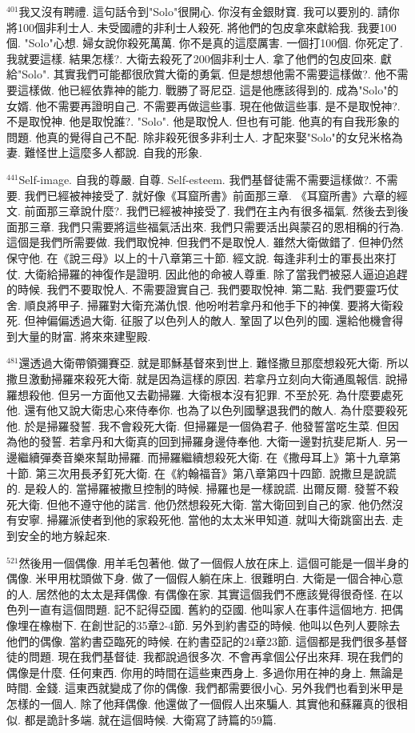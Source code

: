 \documentclass{book}
\begin{document}
$^{401}$我又沒有聘禮.
這句話令到"Solo"很開心.
你沒有金銀財寶.
我可以要別的.
請你將100個非利士人.
未受國禮的非利士人殺死.
將他們的包皮拿來獻給我.
我要100個.
"Solo"心想.
婦女說你殺死萬萬.
你不是真的這麼厲害.
一個打100個.
你死定了.
我就要這樣.
結果怎樣?.
大衛去殺死了200個非利士人.
拿了他們的包皮回來.
獻給"Solo".
其實我們可能都很欣賞大衛的勇氣.
但是想想他需不需要這樣做?.
他不需要這樣做.
他已經依靠神的能力.
戰勝了哥尼亞.
這是他應該得到的.
成為"Solo"的女婿.
他不需要再證明自己.
不需要再做這些事.
現在他做這些事.
是不是取悅神?.
不是取悅神.
他是取悅誰?.
"Solo".
他是取悅人.
但也有可能.
他真的有自我形象的問題.
他真的覺得自己不配.
除非殺死很多非利士人.
才配來娶"Solo"的女兒米格為妻.
難怪世上這麼多人都說.
自我的形象.

$^{441}$Self-image.
自我的尊嚴.
自尊.
Self-esteem.
我們基督徒需不需要這樣做?.
不需要.
我們已經被神接受了.
就好像《耳窟所書》前面那三章.
《耳窟所書》六章的經文.
前面那三章說什麼?.
我們已經被神接受了.
我們在主內有很多福氣.
然後去到後面那三章.
我們只需要將這些福氣活出來.
我們只需要活出與蒙召的恩相稱的行為.
這個是我們所需要做.
我們取悅神.
但我們不是取悅人.
雖然大衛做錯了.
但神仍然保守他.
在《說三母》以上的十八章第三十節.
經文說.
每逢非利士的軍長出來打仗.
大衛給掃羅的神復作是證明.
因此他的命被人尊重.
除了當我們被惡人逼迫追趕的時候.
我們不要取悅人.
不需要證實自己.
我們要取悅神.
第二點.
我們要靈巧仗舍.
順良將甲子.
掃羅對大衛充滿仇恨.
他吩咐若拿丹和他手下的神僕.
要將大衛殺死.
但神偏偏透過大衛.
征服了以色列人的敵人.
鞏固了以色列的國.
還給他機會得到大量的財富.
將來來建聖殿.

$^{481}$還透過大衛帶領彌賽亞.
就是耶穌基督來到世上.
難怪撒旦那麼想殺死大衛.
所以撒旦激動掃羅來殺死大衛.
就是因為這樣的原因.
若拿丹立刻向大衛通風報信.
說掃羅想殺他.
但另一方面他又去勸掃羅.
大衛根本沒有犯罪.
不至於死.
為什麼要處死他.
還有他又說大衛忠心來侍奉你.
也為了以色列國擊退我們的敵人.
為什麼要殺死他.
於是掃羅發誓.
我不會殺死大衛.
但掃羅是一個偽君子.
他發誓當吃生菜.
但因為他的發誓.
若拿丹和大衛真的回到掃羅身邊侍奉他.
大衛一邊對抗斐尼斯人.
另一邊繼續彈奏音樂來幫助掃羅.
而掃羅繼續想殺死大衛.
在《撒母耳上》第十九章第十節.
第三次用長矛釘死大衛.
在《約翰福音》第八章第四十四節.
說撒旦是說謊的.
是殺人的.
當掃羅被撒旦控制的時候.
掃羅也是一樣說謊.
出爾反爾.
發誓不殺死大衛.
但他不遵守他的諾言.
他仍然想殺死大衛.
當大衛回到自己的家.
他仍然沒有安寧.
掃羅派使者到他的家殺死他.
當他的太太米甲知道.
就叫大衛跳窗出去.
走到安全的地方躲起來.

$^{521}$然後用一個偶像.
用羊毛包著他.
做了一個假人放在床上.
這個可能是一個半身的偶像.
米甲用枕頭做下身.
做了一個假人躺在床上.
很難明白.
大衛是一個合神心意的人.
居然他的太太是拜偶像.
有偶像在家.
其實這個我們不應該覺得很奇怪.
在以色列一直有這個問題.
記不記得亞國.
舊約的亞國.
他叫家人在事件這個地方.
把偶像埋在橡樹下.
在創世記的35章2-4節.
另外到約書亞的時候.
他叫以色列人要除去他們的偶像.
當約書亞臨死的時候.
在約書亞記的24章23節.
這個都是我們很多基督徒的問題.
現在我們基督徒.
我都說過很多次.
不會再拿個公仔出來拜.
現在我們的偶像是什麼.
任何東西.
你用的時間在這些東西身上.
多過你用在神的身上.
無論是時間.
金錢.
這東西就變成了你的偶像.
我們都需要很小心.
另外我們也看到米甲是怎樣的一個人.
除了他拜偶像.
他還做了一個假人出來騙人.
其實他和蘇羅真的很相似.
都是詭計多端.
就在這個時候.
大衛寫了詩篇的59篇.
\end{document}
